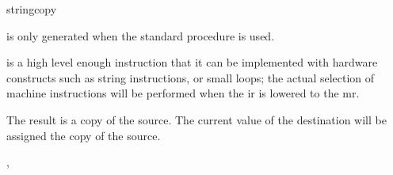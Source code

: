 \begin{instruction}{stringcopy}

  \begin{notes}
     is only generated when the standard procedure
     is used.

     is a high level enough instruction that it
    can be implemented with hardware constructs such as string
    instructions, or small loops; the actual selection of machine
    instructions will be performed when the \ac{ir} is lowered to the
    \ac{mr}.
  \end{notes}

  \begin{results}
  \item The result is a copy of the source.  The current value of the
    destination will be assigned the copy of the source.
  \end{results}

  \begin{operands}
  \item {}
  \item {}
  \item {}
  \item {}
  \item {}
  \end{operands}

  \begin{seealso}
    , 
  \end{seealso}
\end{instruction}

